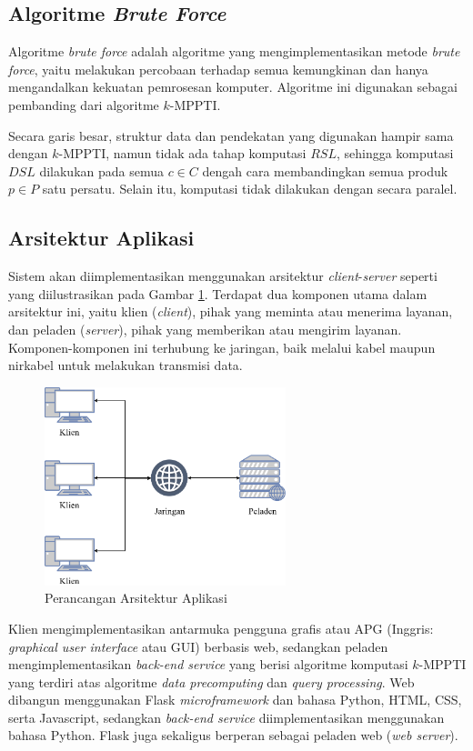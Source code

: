 \subsection{Algoritme \textit{Brute Force}}
\tab Algoritme \textit{brute force} adalah algoritme yang mengimplementasikan metode \textit{brute force}, yaitu melakukan percobaan terhadap semua kemungkinan dan hanya mengandalkan kekuatan pemrosesan komputer. Algoritme ini digunakan sebagai pembanding dari algoritme $k$-MPPTI.

Secara garis besar, struktur data dan pendekatan yang digunakan hampir sama dengan $k$-MPPTI, namun tidak ada tahap komputasi $RSL$, sehingga komputasi $DSL$ dilakukan pada semua $c \in C$ dengah cara membandingkan semua produk $p \in P$ satu persatu. Selain itu, komputasi tidak dilakukan dengan secara paralel. 

\subsection{Arsitektur Aplikasi} 
\tab Sistem akan diimplementasikan menggunakan arsitektur \textit{client}-\textit{server} seperti yang diilustrasikan pada Gambar \ref{fig:arsitektur}. Terdapat dua komponen utama dalam arsitektur ini, yaitu klien (\textit{client}), pihak yang meminta atau menerima layanan, dan peladen (\textit{server}), pihak yang memberikan atau mengirim layanan. Komponen-komponen ini terhubung ke jaringan, baik melalui kabel maupun nirkabel untuk melakukan transmisi data. 

\begin{figure}[h]
	\centering
	\includegraphics[width=7cm]{assets/img/bab3/arsitektur.png}
	\caption{Perancangan Arsitektur Aplikasi}
	\label{fig:arsitektur}
\end{figure}

Klien mengimplementasikan antarmuka pengguna grafis atau APG (Inggris: \textit{graphical user interface} atau GUI) berbasis web, sedangkan peladen mengimplementasikan \textit{back-end service} yang berisi algoritme komputasi $k$-MPPTI yang terdiri atas algoritme \textit{data precomputing} dan \textit{query processing}. Web dibangun menggunakan Flask \textit{microframework} dan bahasa Python, HTML, CSS, serta Javascript, sedangkan \textit{back-end service} diimplementasikan menggunakan bahasa Python. Flask juga sekaligus berperan sebagai peladen web (\textit{web server}).

